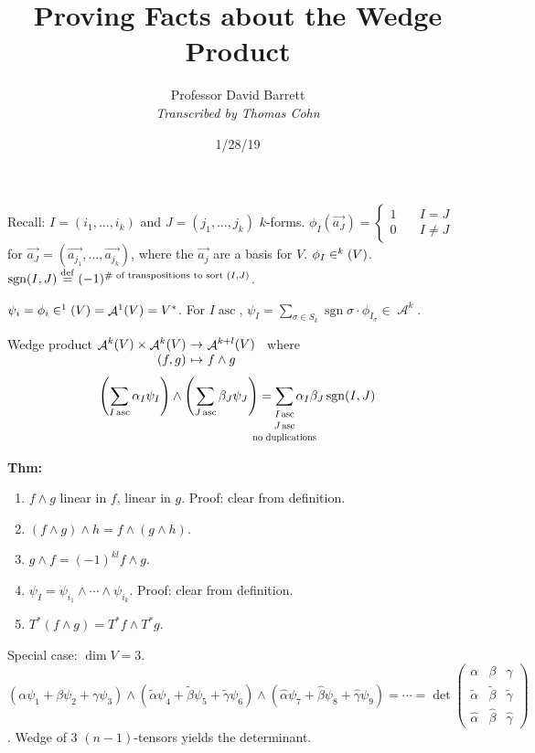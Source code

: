 \documentclass[10pt,letterpaper]{article}
\author{Professor David Barrett\\ \small\textit{Transcribed by Thomas Cohn}}
\title{Proving Facts about the Wedge Product}
\date{1/28/19} %
\newcommand{\n}{\hfill\break}
\newcommand{\up}{\vspace{-\baselineskip}}
\newcommand{\thm}[1]{\par\noindent\settowidth{\hangindent}{\textbf{Thm: }}\textbf{Thm: }#1\n}
\newcommand{\ptxt}[1]{\textrm{\textnormal{#1}}}
\DeclareMathOperator{\sgn}{sgn}
\newcommand{\map}[4]{\!\!\!\begin{array}[t]{rcl}#1 & \!\!\!\!\to & \!\!\!\!#2\\ #3 & \!\!\!\!\mapsto & \!\!\!\!#4\end{array}}
\newcommand{\bigsum}[2]{\smashoperator[lr]{\sum_{\scalebox{#1}{$#2$}}}}
\let\L\relax
\DeclareMathOperator{\L}{\mathscr{L}}
\DeclareMathOperator{\A}{\mathcal{A}}
\DeclareMathOperator{\asc}{asc}
\newcommand{\eqdef}{\overset{\ptxt{def}}{=}}
\newcommand{\paren}[1]{\left(#1\right)}
\begin{document}
\maketitle
\setlength\RaggedRightParindent{\parindent}
\RaggedRight

\par\noindent Recall:\n
$I=(i_{1},\ldots,i_{k})$ and $J=(j_{1},\ldots,j_{k})$ $k$-forms. $\phi_{I}(\vec{a_{J}})=\left\{\begin{array}{ll}1 & \quad{}I=J\\ 0 & \quad{}I\ne{}J\end{array}\right.$ for $\vec{a_{J}}=(\vec{a_{j_{1}}},\ldots,\vec{a_{j_{k}}})$, where the $\vec{a_{j}}$ are a basis for $V$.\n
$\phi_{I}\in\L^{k}(V)$.\n
$\sgn(I,J)\eqdef(-1)^{\ptxt{\# of transpositions to sort }(I,J)}$.\n

\par\noindent $\psi_{i}=\phi_{i}\in\L^{1}(V)=\A^{1}(V)=V^{*}$. For $I\asc$, $\psi_{I}=\sum_{\sigma\in{}S_{k}}\sgn\sigma\cdot\phi_{I_{\sigma}}\in\A^{k}$.\n

\par\noindent Wedge product $\map{\A^{k}(V)\times\A^{k}(V)}{\A^{k+l}(V)}{(f,g)}{f\wedge{}g}$ where
\[
\paren{\sum_{I\asc}\alpha_{I}\psi_{I}}\wedge\paren{\sum_{J\asc}\beta_{J}\psi_{J}}=\bigsum{0.75}{\begin{array}{c}I\asc\\ J\asc\\ \ptxt{no duplications}\end{array}}\alpha_{I}\beta_{J}\sgn(I,J)
\]

\thm{\begin{enumerate}[label=(\alph*)]
	\item $f\wedge{}g$ linear in $f$, linear in $g$.\n
	Proof: clear from definition.
	\item $(f\wedge{}g)\wedge{}h=f\wedge(g\wedge{}h)$.
	\item $g\wedge{}f=(-1)^{kl}f\wedge{}g$.
	\item $\psi_{I}=\psi_{i_{1}}\wedge\cdots\wedge\psi_{i_{k}}$.\n
	Proof: clear from definition.
	\item $T^{*}(f\wedge{}g)=T^{*}f\wedge{}T^{*}g$.
\end{enumerate}}\up

\par\noindent Special case: $\dim{}V=3$.\n
$(\alpha\psi_{1}+\beta\psi_{2}+\gamma\psi_{3})\wedge(\tilde{\alpha}\psi_{4}+\tilde{\beta}\psi_{5}+\tilde{\gamma}\psi_{6})\wedge(\hat{\alpha}\psi_{7}+\hat{\beta}\psi_{8}+\hat{\gamma}\psi_{9})=\cdots=\det\paren{\begin{array}{ccc}\alpha & \beta & \gamma\\ \tilde{\alpha} & \tilde{\beta} & \tilde{\gamma}\\ \hat{\alpha} & \hat{\beta} & \hat{\gamma}\end{array}}$.\up\n
Wedge of $3$ $(n-1)$-tensors yields the determinant.\n
\end{document}
